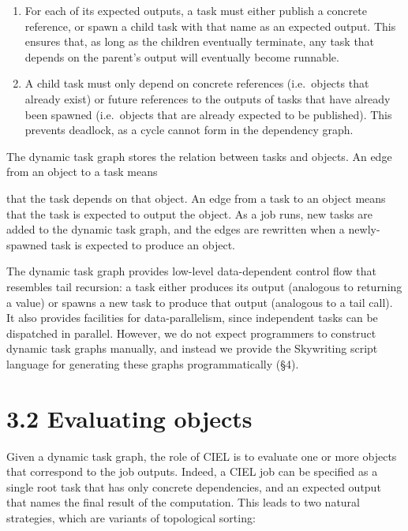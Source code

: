 \documentclass[
]{article}
\providecommand{\tightlist}{%
  \setlength{\itemsep}{0pt}\setlength{\parskip}{0pt}}
\begin{document}
\begin{enumerate}
\def\labelenumi{\arabic{enumi}.}
\tightlist
\item
  For each of its expected outputs, a task must either publish a
  concrete reference, or spawn a child task with that name as an
  expected output. This ensures that, as long as the children eventually
  terminate, any task that depends on the parent's output will
  eventually become runnable.\\
\item
  A child task must only depend on concrete references (i.e.~objects
  that already exist) or future references to the outputs of tasks that
  have already been spawned (i.e.~objects that are already expected to
  be published). This prevents deadlock, as a cycle cannot form in the
  dependency graph.
\end{enumerate}

The dynamic task graph stores the relation between tasks and objects. An
edge from an object to a task means

that the task depends on that object. An edge from a task to an object
means that the task is expected to output the object. As a job runs, new
tasks are added to the dynamic task graph, and the edges are rewritten
when a newly-spawned task is expected to produce an object.

The dynamic task graph provides low-level data-dependent control flow
that resembles tail recursion: a task either produces its output
(analogous to returning a value) or spawns a new task to produce that
output (analogous to a tail call). It also provides facilities for
data-parallelism, since independent tasks can be dispatched in parallel.
However, we do not expect programmers to construct dynamic task graphs
manually, and instead we provide the Skywriting script language for
generating these graphs programmatically (§4).

\section{3.2 Evaluating objects}\label{evaluating-objects}

Given a dynamic task graph, the role of CIEL is to evaluate one or more
objects that correspond to the job outputs. Indeed, a CIEL job can be
specified as a single root task that has only concrete dependencies, and
an expected output that names the final result of the computation. This
leads to two natural strategies, which are variants of topological
sorting:
\end{document}
